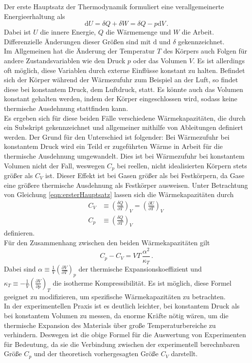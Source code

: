 Der erste Hauptsatz der Thermodynamik formuliert eine verallgemeinerte Energieerhaltung als
\begin{equation}
  \text{d}U = \delta Q + \delta W = \delta Q - p \text{d}V\,.
  \label{eqn:ersterHauptsatz}
\end{equation}
Dabei ist $U$ die innere Energie, $Q$ die Wärmemenge und $W$ die Arbeit. Differenzielle Änderungen dieser Größen sind mit $\text{d}$ und $\delta$ gekennzeichnet.\\
Im Allgemeinen hat die Änderung der Temperatur $T$ des Körpers auch Folgen für andere Zustandsvariablen wie den Druck $p$ oder das Volumen $V$. Es ist allerdings oft möglich, diese Variablen durch externe Einflüsse konstant zu halten. Befindet sich der Körper während der Wärmezufuhr zum Beispiel an der Luft, so findet diese bei konstantem Druck, dem Luftdruck, statt. Es könnte auch das Volumen konstant gehalten werden, indem der Körper eingeschlossen wird, sodass keine thermische Ausdehnung stattfinden kann.\\
Es ergeben sich für diese beiden Fälle verschiedene Wärmekapazitäten, die durch ein Subskript gekennzeichnet und allgemeiner mithilfe von Ableitungen definiert werden. Der Grund für den Unterschied ist folgender: Bei Wärmezufuhr bei konstantem Druck wird ein Teild er zugeführten Wärme in Arbeit für die thermische Ausdehnung umgewandelt. Dies ist bei Wärmezufuhr bei konstantem Volumen nicht der Fall, weswegen $C_p$ bei reellen, nicht idealisierten Körpern stets größer als $C_V$ ist. Dieser Effekt ist bei Gasen größer als bei Festkörpern, da Gase eine größere thermische Ausdehnung als Festkörper ausweisen.
Unter Betrachtung von Gleichung \ref{eqn:ersterHauptsatz} lassen sich die Wärmekapazitäten durch
\begin{align}
  C_V &\equiv \left(\frac{\delta Q}{\partial T}\right)_V = \left(\frac{\partial U}{\partial T}\right)_V\, \label{eqn:C_V}\\
  C_p &\equiv \left(\frac{\delta Q}{\partial T}\right)_V \label{eqn:C_p}
\end{align}
definieren.\\
Für den Zusammenhang zwischen den beiden Wärmekapazitäten gilt
\begin{equation}
  C_p - C_V = V T \, \frac{\alpha^2}{\kappa_T}\,.
  \label{eqn:CpminusCV}
\end{equation}
Dabei sind $\alpha \equiv \frac{1}{V}\left(\frac{\partial V}{\partial T}\right)_p$ der thermische Expansionskoeffizient und $\kappa_T \equiv - \frac{1}{V}\left(\frac{\partial V}{\partial p}\right)_T$ die isotherme Kompressibilität. Es ist möglich, diese Formel geeignet zu modifizieren, um spezifische Wärmekapazitäten zu betrachten.\\
In der experimentellen Praxis ist es deutlich leichter, bei konstantem Druck als bei konstantem Volumen zu messen, da enorme Kräfte nötig wären, um die thermische Expansion des Materials über große Temperaturbereiche zu verhindern. Deswegen ist die obige Formel für die Auswertung von Experimenten für Bedeutung, da sie die Verbindung zwischen der experimentell berechnbaren Größe $C_p$ und der theoretisch vorhergesagten Größe $C_V$ darstellt.

